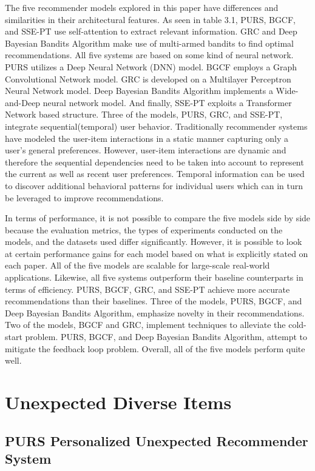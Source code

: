 The five recommender models explored in this paper have differences and similarities in their architectural features. As seen in table 3.1, PURS, BGCF, and SSE-PT use self-attention to extract relevant information. GRC and Deep Bayesian Bandits Algorithm make use of multi-armed bandits to find optimal recommendations. All five systems are based on some kind of neural network. PURS utilizes a Deep Neural Network (DNN) model. BGCF employs a Graph Convolutional Network model. GRC is developed on a Multilayer Perceptron Neural Network model. Deep Bayesian Bandits Algorithm implements a Wide-and-Deep neural network model. And finally, SSE-PT exploits a Transformer Network based structure. Three of the models, PURS, GRC, and SSE-PT, integrate sequential(temporal) user behavior. Traditionally recommender systems have modeled the user-item interactions in a static manner capturing only a user's general preferences. However, user-item interactions are dynamic and therefore the sequential dependencies need to be taken into account to represent the current as well as recent user preferences. Temporal information can be used to discover additional behavioral patterns for individual users which can in turn be leveraged to improve recommendations.

In terms of performance, it is not possible to compare the five models side by side because the evaluation metrics, the types of experiments conducted on the models, and the datasets used differ significantly. However, it is possible to look at certain performance gains for each model based on what is explicitly stated on each paper. All of the five models are scalable for large-scale real-world applications. Likewise, all five systems outperform their baseline counterparts in terms of efficiency. PURS, BGCF, GRC, and SSE-PT achieve more accurate recommendations than their baselines. Three of the models, PURS, BGCF, and Deep Bayesian Bandits Algorithm, emphasize novelty in their recommendations. Two of the models, BGCF and GRC, implement techniques to alleviate the cold-start problem. PURS, BGCF, and Deep Bayesian Bandits Algorithm, attempt to mitigate the feedback loop problem. Overall, all of the five models perform quite well. 

\chapter{Unexpected Diverse Items}
\section{PURS Personalized Unexpected Recommender System}

